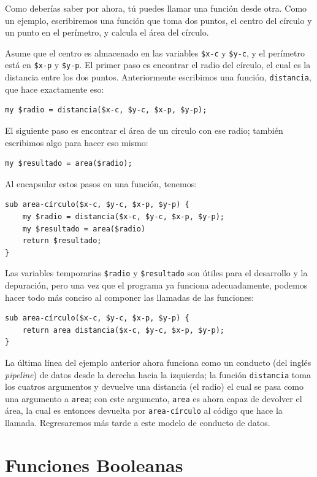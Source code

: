 Como deberías saber por ahora, tú puedes llamar una función
desde otra. Como un ejemplo, escribiremos una función 
que toma dos puntos, el centro del círculo y un punto en el 
perímetro, y calcula el área del círculo.

Asume que el centro es almacenado en las variables {\tt \$x-c} y
{\tt \$y-c}, y el perímetro está en {\tt \$x-p} y {\tt \$y-p}. 
El primer paso es encontrar el radio del círculo, el cual es la 
distancia entre los dos puntos. Anteriormente escribimos una función,
{\tt distancia}, que hace exactamente eso:

\begin{verbatim}
my $radio = distancia($x-c, $y-c, $x-p, $y-p);
\end{verbatim}
%
El siguiente paso es encontrar el área de un círculo 
con ese radio; también escribimos algo para hacer eso mismo:

\begin{verbatim}
my $resultado = area($radio);
\end{verbatim}
%
Al encapsular estos pasos en una función, tenemos:

\begin{verbatim}
sub area-círculo($x-c, $y-c, $x-p, $y-p) {
    my $radio = distancia($x-c, $y-c, $x-p, $y-p);
    my $resultado = area($radio)
    return $resultado;
}
\end{verbatim}
%
Las variables temporarias {\tt \$radio} y {\tt \$resultado} son útiles
para el desarrollo y la depuración, pero una vez que el programa ya funciona
adecuadamente, podemos hacer todo más conciso al componer las llamadas
de las funciones:

\begin{verbatim}
sub area-círculo($x-c, $y-c, $x-p, $y-p) {
    return area distancia($x-c, $y-c, $x-p, $y-p);
}
\end{verbatim}
%

La última línea del ejemplo anterior ahora funciona como
un conducto (del inglés \emph{pipeline}) de datos desde la 
derecha hacia la izquierda; la función \verb|distancia| toma 
los cuatros argumentos y devuelve una distancia (el radio)
el cual se pasa como una argumento a \verb|area|; con este
argumento, \verb|area| es ahora capaz de devolver el área,
la cual es entonces devuelta por \verb|area-círculo| al
código que hace la llamada. Regresaremos más tarde a este modelo
de conducto de datos.

\section{Funciones Booleanas}
\label{boolean}

